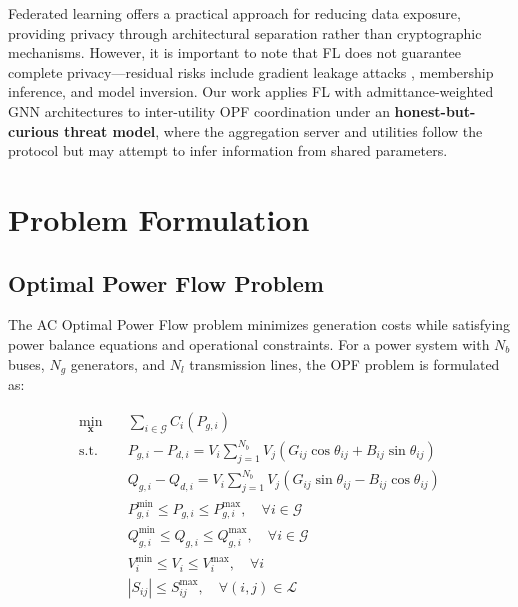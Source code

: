 \documentclass[journal,10pt]{IEEEtran}
\begin{document}
Federated learning offers a practical approach for reducing data exposure, providing privacy through architectural separation rather than cryptographic mechanisms. However, it is important to note that FL does not guarantee complete privacy---residual risks include gradient leakage attacks \cite{zhu2019deep}, membership inference, and model inversion. Our work applies FL with admittance-weighted GNN architectures to inter-utility OPF coordination under an \textbf{honest-but-curious threat model}, where the aggregation server and utilities follow the protocol but may attempt to infer information from shared parameters.

\section{Problem Formulation}

\subsection{Optimal Power Flow Problem}

The AC Optimal Power Flow problem minimizes generation costs while satisfying power balance equations and operational constraints. For a power system with $N_b$ buses, $N_g$ generators, and $N_l$ transmission lines, the OPF problem is formulated as:

\begin{align}
\min_{\mathbf{x}} \quad & \sum_{i \in \mathcal{G}} C_i(P_{g,i}) \label{eq:obj}\\
\text{s.t.} \quad & P_{g,i} - P_{d,i} = V_i \sum_{j=1}^{N_b} V_j (G_{ij}\cos\theta_{ij} + B_{ij}\sin\theta_{ij}) \label{eq:pbal}\\
& Q_{g,i} - Q_{d,i} = V_i \sum_{j=1}^{N_b} V_j (G_{ij}\sin\theta_{ij} - B_{ij}\cos\theta_{ij}) \label{eq:qbal}\\
& P_{g,i}^{\min} \leq P_{g,i} \leq P_{g,i}^{\max}, \quad \forall i \in \mathcal{G} \label{eq:pglim}\\
& Q_{g,i}^{\min} \leq Q_{g,i} \leq Q_{g,i}^{\max}, \quad \forall i \in \mathcal{G} \label{eq:qglim}\\
& V_i^{\min} \leq V_i \leq V_i^{\max}, \quad \forall i \label{eq:vlim}\\
& |S_{ij}| \leq S_{ij}^{\max}, \quad \forall (i,j) \in \mathcal{L} \label{eq:slim}
\end{align}
\end{document}
